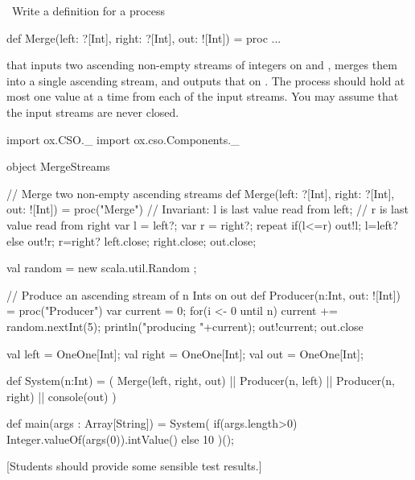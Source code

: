 \begin{question}
\Programming\
Write a definition for a process
%
\begin{scala}
def Merge(left: ?[Int], right: ?[Int], out: ![Int]) = proc ...
\end{scala}
%
that inputs two ascending non-empty streams of integers on  and
\SCALA{right}, merges them into a single ascending stream, and outputs that on
\SCALA{out}.  The process should hold at most one value at a time from each of
the input streams.  You may assume that the input streams are never closed.
\end{question}
%
\begin{answer}
%
\begin{scala}
import ox.CSO._
import ox.cso.Components._

object MergeStreams{
  // Merge two non-empty ascending streams
  def Merge(left: ?[Int], right: ?[Int], out: ![Int]) 
  = proc("Merge"){
    // Invariant: l is last value read from left; 
    // r is last value read from right
    var l = left?; var r = right?;
    repeat{
      if(l<=r){ out!l; l=left? }
      else{ out!r; r=right? }
    }
    left.close; right.close; out.close;
  }

  val random = new scala.util.Random ;

  // Produce an ascending stream of n Ints on out
  def Producer(n:Int, out: ![Int]) = proc("Producer"){
    var current = 0;
    for(i <- 0 until n){ 
      current += random.nextInt(5); 
      println("producing "+current); 
      out!current;
    }
    out.close
  }

  val left = OneOne[Int]; 
  val right = OneOne[Int];
  val out = OneOne[Int];

  def System(n:Int) = (
    Merge(left, right, out) || Producer(n, left) 
    || Producer(n, right) || console(out) 
  )

  def main(args : Array[String]) = 
    System( 
      if(args.length>0)
        Integer.valueOf(args(0)).intValue()
      else 10 
    )();
}
\end{scala}
%
[Students should provide some sensible test results.]
\end{answer}
